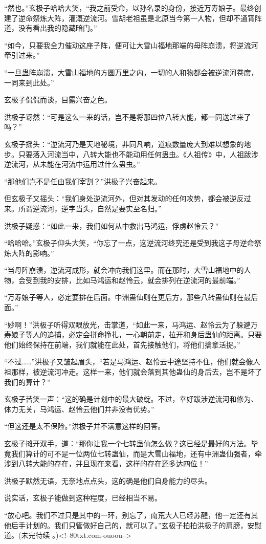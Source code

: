 \begin{this_body}
“然也。”玄极子哈哈大笑，“我之前受命，以孙名录的身份，接近万寿娘子。最终创建了逆命祭炼大阵，灌溉逆流河。雪胡老祖虽是北原当今第一人物，但却不通宵阵道，没有看出我的隐藏暗门。”

“如今，只要我全力催动这座子阵，便可让大雪山福地那端的母阵崩溃，将逆流河牵引过来。”

“一旦蛊阵崩溃，大雪山福地的方圆万里之内，一切的人和物都会被逆流河卷席，一同来到此处。”

玄极子侃侃而谈，目露兴奋之色。

洪极子讶然：“可是这么一来的话，岂不是将那四位八转大能，都一同送过来了吗？”

玄极子摇头：“逆流河乃是天地秘境，非同凡响，道痕数量庞大到难以想象的地步。只要落入河流当中，八转大能也不能动用任何蛊虫。《人祖传》中，人祖跋涉逆流河，从未能在河流中运用过什么蛊虫。”

“那他们岂不是任由我们宰割？”洪极子兴奋起来。

但玄极子又摇头：“我们身处逆流河外，但对其发动的任何攻势，都会被逆反过来。所谓逆流河，逆字当头，自然是要实至名归。”

洪极子疑惑：“如此一来，我们如何从中救出马鸿运，俘虏赵怜云？”

“哈哈哈。”玄极子仰头大笑，“你忘了一点，这逆流河终究还是受到我这子母逆命祭炼大阵的影响。”

“当母阵崩溃，逆流河成形，就会冲向我们这里。而在那时，大雪山福地中的人物，会受到我的安排，比如马鸿运和赵怜云，就会排列在逆流河的最前端。”

“万寿娘子等人，必定要排在后面。中洲蛊仙则在更后方，那些八转蛊仙则在最后面。”

“妙啊！”洪极子听得双眼放光，击掌道，“如此一来，马鸿运、赵怜云为了躲避万寿娘子等人的追捕，必定会拼命挣扎，一心朝前走，拉开和身后蛊仙的距离。只要他们始终保持在前端，我们就能在此处，首先接触他们，将他们擒拿活捉。”

“不过……”洪极子又皱起眉头，“若是马鸿运、赵怜云中途坚持不住，他们就会像人祖那样，被逆流河冲走。这样一来，他们就会落到其他蛊仙的身后去，岂不是坏了我们的算计？”

玄极子苦笑一声：“这的确是计划中的最大破绽。不过，幸好跋涉逆流河和修为、体力无关，马鸿运、赵怜云他们并非没有优势。”

“但这还是太不保险。”洪极子并不满意这样的回答。

玄极子摊开双手，道：“那你让我一个七转蛊仙怎么做？这已经是最好的方法。毕竟我们算计的可不是一位两位七转蛊仙，而是大雪山福地，还有中洲蛊仙强者，牵涉到八转大能的存在，并且现在来看，这样的存在还多达四位！”

洪极子默然无语，无奈地点点头，这的确是他们自身能力的尽头。

说实话，玄极子能做到这种程度，已经相当不易。

“放心吧。我们不过只是其中的一环，别忘了，南荒大人已经苏醒，他一定还有其他后手计划的。我们只管做好自己的，就可以了。”玄极子拍拍洪极子的肩膀，安慰道。(未完待续 。)<!--80txt.com-ouoou-->

\end{this_body}

